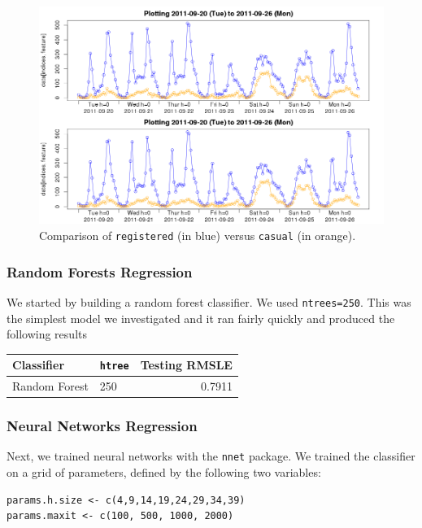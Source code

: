 \documentclass[12pt]{article}
\begin{document}
\begin{figure}[H]
	\centering
	\includegraphics[width=.98\textwidth]{figures/compare-casual-registered.png}
	\caption{Comparison of {\color{blue}\texttt{registered}} (in blue) versus {\color{orange}\texttt{casual}} (in orange).}
	\label{fig:compare-casual-registered}
\end{figure}

\subsubsection{Random Forests Regression}
We started by building a random forest classifier. We used \texttt{ntrees=250}. This was the simplest model we investigated and it ran fairly quickly and produced the following results
	
\begin{table}[H]
\centering
\begin{tabular}{llr}
	Classifier & \texttt{htree} & Testing RMSLE \\
	\hline
	Random Forest & 250 & 0.7911\\
\end{tabular}
\end{table}

\subsubsection{Neural Networks Regression}

Next, we trained neural networks with the \texttt{nnet} package. We trained the classifier on a grid of parameters, defined by the following two variables:
{\color{blue}
\begin{verbatim}
params.h.size <- c(4,9,14,19,24,29,34,39)
params.maxit <- c(100, 500, 1000, 2000)
\end{verbatim}}
\end{document}
